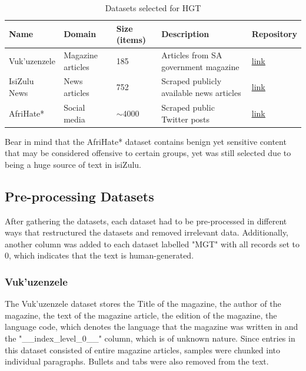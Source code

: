 \documentclass[11pt]{article}
\begin{document}
    \begin{table}[H]
    \centering
    \begin{tabular}{l l l l l}
    \toprule
    \textbf{Name} & \textbf{Domain} & \textbf{Size (items)} & \textbf{Description} & \textbf{Repository} \\
    \midrule
    Vuk'uzenzele 
        & Magazine articles 
        & 185 
        & Articles from SA government magazine 
        & \href{https://github.com/dsfsi/vukuzenzele-nlp}{\uline{link}} \\
    IsiZulu News 
        & News articles 
        & 752 
        & Scraped publicly available news articles
        & \href{https://github.com/dsfsi/za-isizulu-siswati-news-2022}{\uline{link}} \\
    AfriHate* 
        & Social media 
        & $\sim$4000 
        & Scraped public Twitter posts 
        & \href{https://github.com/AfriHate/AfriHate}{\uline{link}} \\
    \end{tabular}
    \caption{Datasets selected for HGT}
    \end{table}

    Bear in mind that the AfriHate* dataset contains benign yet sensitive content 
    that may be considered offensive to certain groups, yet was still selected due 
    to being a huge source of text in isiZulu.
    
    \subsection{Pre-processing Datasets}
    After gathering the datasets, each dataset had to be pre-processed in different 
    ways that restructured the datasets and removed irrelevant data. Additionally, 
    another column was added to each dataset labelled "MGT" with all records set to 0, 
    which indicates that the text is human-generated.
     
    \subsubsection{Vuk'uzenzele}
    The Vuk'uzenzele dataset \citep{Vuk'unzenzele} stores the Title of the magazine, 
    the author of the magazine, the text of the magazine article, the edition of the 
    magazine, the language code, which denotes the language that the magazine was 
    written in and the "\_\_index\_level\_0\_\_" column, which is of unknown nature. Since entries 
    in this dataset consisted of entire magazine articles, samples were chunked into 
    individual paragraphs. Bullets and tabs were also removed from the text.
    
\end{document}

